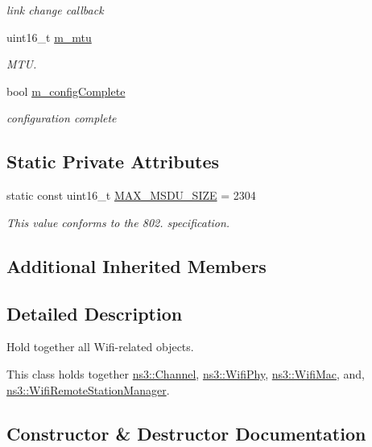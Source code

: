 \begin{DoxyCompactItemize}
\begin{DoxyCompactList}\small\item\em link change callback \end{DoxyCompactList}\item 
uint16\+\_\+t \hyperlink{classns3_1_1WifiNetDevice_a727b77288e39b2f4c4d2a35f733e7bee}{m\+\_\+mtu}
\begin{DoxyCompactList}\small\item\em M\+TU. \end{DoxyCompactList}\item 
bool \hyperlink{classns3_1_1WifiNetDevice_a46798e25d3a4dafd5d72c1ba04ca3c01}{m\+\_\+config\+Complete}
\begin{DoxyCompactList}\small\item\em configuration complete \end{DoxyCompactList}\end{DoxyCompactItemize}
\subsection*{Static Private Attributes}
\begin{DoxyCompactItemize}
\item 
static const uint16\+\_\+t \hyperlink{classns3_1_1WifiNetDevice_a44ed8fe233665265e6c516b807d8c2e9}{M\+A\+X\+\_\+\+M\+S\+D\+U\+\_\+\+S\+I\+ZE} = 2304
\begin{DoxyCompactList}\small\item\em This value conforms to the 802. specification. \end{DoxyCompactList}\end{DoxyCompactItemize}
\subsection*{Additional Inherited Members}


\subsection{Detailed Description}
Hold together all Wifi-\/related objects.

This class holds together \hyperlink{classns3_1_1Channel}{ns3\+::\+Channel}, \hyperlink{classns3_1_1WifiPhy}{ns3\+::\+Wifi\+Phy}, \hyperlink{classns3_1_1WifiMac}{ns3\+::\+Wifi\+Mac}, and, \hyperlink{classns3_1_1WifiRemoteStationManager}{ns3\+::\+Wifi\+Remote\+Station\+Manager}. 

\subsection{Constructor \& Destructor Documentation}
